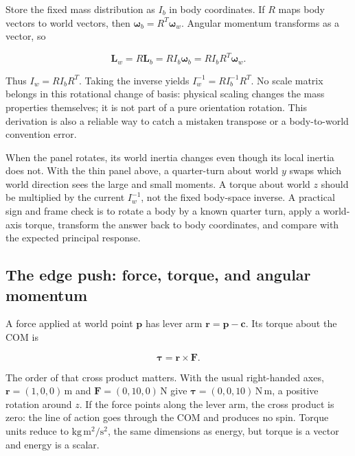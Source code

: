 Store the fixed mass distribution as \(I_b\) in body coordinates. If \(R\) maps body vectors to world vectors, then \(\boldsymbol\omega_b=R^T\boldsymbol\omega_w\). Angular momentum transforms as a vector, so

\[
\mathbf L_w=R\mathbf L_b=RI_b\boldsymbol\omega_b=RI_bR^T\boldsymbol\omega_w.
\]

Thus \(I_w=RI_bR^T\). Taking the inverse yields \(I_w^{-1}=RI_b^{-1}R^T\). No scale matrix belongs in this rotational change of basis: physical scaling changes the mass properties themselves; it is not part of a pure orientation rotation. This derivation is also a reliable way to catch a mistaken transpose or a body-to-world convention error.

When the panel rotates, its world inertia changes even though its local inertia does not. With the thin panel above, a quarter-turn about world \(y\) swaps which world direction sees the large and small moments. A torque about world \(z\) should be multiplied by the current \(I_w^{-1}\), not the fixed body-space inverse. A practical sign and frame check is to rotate a body by a known quarter turn, apply a world-axis torque, transform the answer back to body coordinates, and compare with the expected principal response.


\subsection{The edge push: force, torque, and angular momentum}\label{06-engine-ii-ch034-the-edge-push-force-torque-and-angular-momentum}

\hypertarget{06-engine-ii-ch034-the-edge-push-force-torque-and-angular-momentum}{}

A force applied at world point \(\mathbf p\) has lever arm \(\mathbf r=\mathbf p-\mathbf c\). Its torque about the COM is

\[
\boldsymbol\tau=\mathbf r\times\mathbf F.
\]

The order of that cross product matters. With the usual right-handed axes, \(\mathbf r=(1,0,0)\,\mathrm m\) and \(\mathbf F=(0,10,0)\,\mathrm N\) give \(\boldsymbol\tau=(0,0,10)\,\mathrm{N\,m}\), a positive rotation around \(z\). If the force points along the lever arm, the cross product is zero: the line of action goes through the COM and produces no spin. Torque units reduce to \(\mathrm{kg\,m^2/s^2}\), the same dimensions as energy, but torque is a vector and energy is a scalar.

